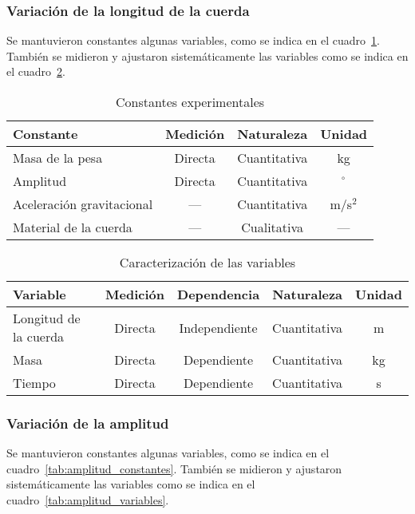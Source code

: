 \documentclass[letterpaper]{report}
\numberwithin{table}{section}
\begin{document}
\subsubsection{Variación de la longitud de la cuerda}

Se mantuvieron constantes algunas variables, como se indica en el
cuadro~\ref{tab:longitud_constantes}. También se midieron y ajustaron
sistemáticamente las variables como se indica en el
cuadro~\ref{tab:longitud_variables}.

\begin{table}[h!]
  \centering
  \begin{tabular}{lccc}
    \toprule
    \textbf{Constante} & \textbf{Medición} & \textbf{Naturaleza} &
    \textbf{Unidad}\\
    \midrule
    Masa de la pesa & Directa & Cuantitativa & kg \\
    Amplitud & Directa & Cuantitativa & $^{\circ}$ \\
    Aceleración gravitacional & — & Cuantitativa & m/s$^{2}$ \\
    Material de la cuerda & — & Cualitativa & — \\
    \bottomrule
  \end{tabular}
  \caption{Constantes experimentales}\label{tab:longitud_constantes}
\end{table}

\begin{table}[ht!]
  \centering
  \begin{tabular}{lcccc}
    \toprule
    \textbf{Variable} & \textbf{Medición} & \textbf{Dependencia}
    & \textbf{Naturaleza} & \textbf{Unidad} \\
    \midrule
    Longitud de la cuerda & Directa & Independiente & Cuantitativa & m\\
    Masa & Directa & Dependiente  & Cuantitativa & kg\\
    Tiempo & Directa & Dependiente & Cuantitativa & s\\
    \bottomrule
  \end{tabular}
  \caption{Caracterización de las variables}\label{tab:longitud_variables}
\end{table}

\subsubsection{Variación de la amplitud}

Se mantuvieron constantes algunas variables, como se indica en el
cuadro~\ref{tab:amplitud_constantes}. También se midieron y ajustaron
sistemáticamente las variables como se indica en el
cuadro~\ref{tab:amplitud_variables}.
\end{document}
